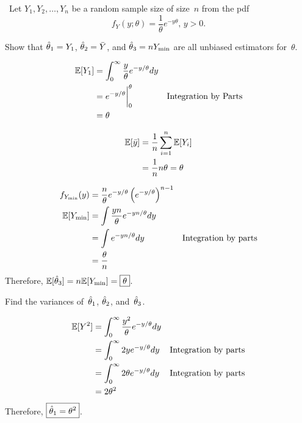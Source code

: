 \begin{problem}
  ~Let ${Y_1,Y_2,\ldots,Y_n}$ be a random sample size of size~$n$ from the pdf
  \begin{equation}
    f_Y(y;\theta) = \frac{1}{\theta}e^{-y\theta}\text{, }y > 0 \text{.}
  \end{equation}
\end{problem}

\begin{subproblem}
  Show that ${\hat{\theta}_{1} = Y_1}$, ${\hat{\theta}_{2} = \bar{Y}}$, and ${\hat{\theta}_{3} = nY_{\min}}$ are all unbiased estimators for~$\theta$.
\end{subproblem}

\begin{align}
  \mathbb{E}\lbrack Y_1\rbrack &= \int_{0}^{\infty} \frac{y}{\theta} e^{-y/\theta}dy \\
               &= e^{-y/\theta} \bigg\vert_{0}^{\theta} & \text{Integration by Parts}\\
               &= \theta
\end{align}

\begin{align}
  \mathbb{E}\lbrack\bar{y}\rbrack &= \frac{1}{n} \sum_{i=1}^{n} \mathbb{E}\lbrack Y_i\rbrack \\
                   &= \frac{1}{n} n\theta = \theta
\end{align}

\begin{align}
  f_{Y_{\min}}(y) &= \frac{n}{\theta}e^{-y/\theta}\left(e^{-y/\theta}\right)^{n-1} \\
  \mathbb{E}\lbrack Y_{\min}\rbrack &= \int \frac{yn}{\theta} e^{-yn/\theta} dy \\
                    &= \int e^{-yn/\theta} dy & \text{Integration by parts} \\
                    &= \frac{\theta}{n}
\end{align}
Therefore, ${\mathbb{E}\lbrack\hat{\theta}_{3}\rbrack = n\mathbb{E}\lbrack Y_{\min}\rbrack = \boxed{\theta}}$.

\begin{subproblem}
  Find the variances of~$\hat{\theta}_{1}$, $\hat{\theta}_{2}$, and~$\hat{\theta}_{3}$.
\end{subproblem}

\begin{align}
  \mathbb{E}\lbrack Y^2\rbrack &= \int_{0}^{\infty} \frac{y^2}{\theta} e^{-y/\theta}dy \\
               &= \int_{0}^{\infty} 2y e^{-y/\theta}dy & \text{Integration by parts}\\
               &= \int_{0}^{\infty} 2\theta e^{-y/\theta}dy & \text{Integration by parts}\\
               &= 2\theta^{2}
\end{align}
Therefore, ${\boxed{\hat{\theta}_{1} = \theta^2}}$.

